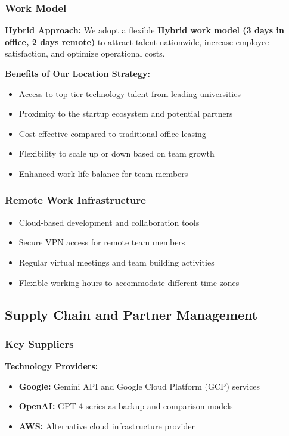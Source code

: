 \subsubsection{Work Model}
\textbf{Hybrid Approach:} We adopt a flexible \textbf{Hybrid work model (3 days in office, 2 days remote)} to attract talent nationwide, increase employee satisfaction, and optimize operational costs.

\textbf{Benefits of Our Location Strategy:}
\begin{itemize}
    \item Access to top-tier technology talent from leading universities
    \item Proximity to the startup ecosystem and potential partners
    \item Cost-effective compared to traditional office leasing
    \item Flexibility to scale up or down based on team growth
    \item Enhanced work-life balance for team members
\end{itemize}

\subsubsection{Remote Work Infrastructure}
\begin{itemize}
    \item Cloud-based development and collaboration tools
    \item Secure VPN access for remote team members
    \item Regular virtual meetings and team building activities
    \item Flexible working hours to accommodate different time zones
\end{itemize}

\subsection{Supply Chain and Partner Management}

\subsubsection{Key Suppliers}
\textbf{Technology Providers:}
\begin{itemize}
    \item \textbf{Google:} Gemini API and Google Cloud Platform (GCP) services
    \item \textbf{OpenAI:} GPT-4 series as backup and comparison models
    \item \textbf{AWS:} Alternative cloud infrastructure provider
\end{itemize}

